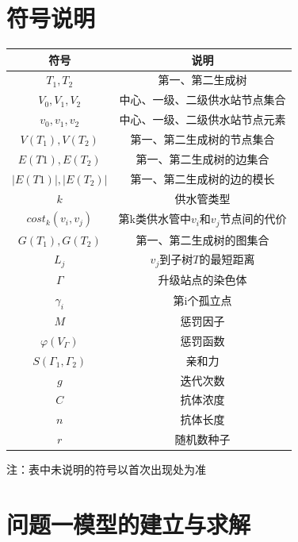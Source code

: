 \documentclass{whutmod}
\begin{document}
	\section{符号说明}
		\begin{table}[H]
		\centering
		\setlength{\tabcolsep}{12mm}
		\begin{tabular}{cc}
			\toprule[1.5pt]
			\multicolumn{1}{m{5cm}}{\centering 符号} & \multicolumn{1}{m{5cm}}{\centering 说明} \\
			\midrule[0.5pt]		
			$T_1,T_2$  & 第一、第二生成树  \\ 
			$V_0,V_1,V_2$  & 中心、一级、二级供水站节点集合  \\ 
			$v_0,v_1,v_2$  & 中心、一级、二级供水站节点元素  \\ 
			$V(T_1),V(T_2)$  & 第一、第二生成树的节点集合 \\ 
		   	$E(T1),E(T_2)$  &第一、第二生成树的边集合\\ 
		   	$|E(T1)|,|E(T_2)|$  & 第一、第二生成树的边的模长 \\ 
		   	$k$  & 供水管类型 \\
		   	$cost_k(v_i,v_j)$  & 第k类供水管中$v_i$和$v_j$节点间的代价 \\ 
		   	$G(T_1),G(T_2)$  &第一、第二生成树的图集合  \\ 
		   	$L_j$  & $v_j$到子树$T$的最短距离  \\ 
		   	$\Gamma$  & 升级站点的染色体  \\ 
		   	$\gamma_i$  & 第i个孤立点  \\ 
		   	$M$  & 惩罚因子  \\ 
			$\varphi(V_{\Gamma})$  & 惩罚函数  \\ 
		  $S(\Gamma_1,\Gamma_2)$  & 亲和力  \\ 
		  		  $g$  & 迭代次数  \\ 
		  	 $C$  & 抗体浓度 \\ 
		  	 $n$  & 抗体长度 \\ 
		  		  	 $r$  & 随机数种子 \\ 
			\bottomrule[1.5pt]
		\end{tabular}
		\begin{tablenotes}
		\item 注：表中未说明的符号以首次出现处为准
		\end{tablenotes}
		\end{table}
\newpage
	\section{问题一模型的建立与求解}
\end{document}
